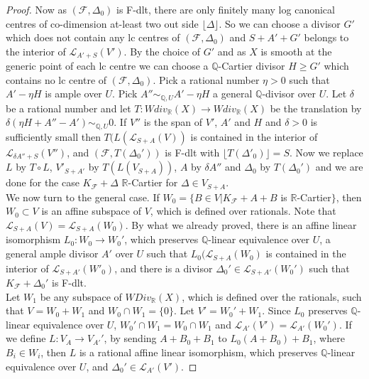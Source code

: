 \documentclass[12pt]{amsart}%
\theoremstyle{plain}
\theoremstyle{remark}
\theoremstyle{definition}
\newcommand{\<}{\leq}
\newcommand{\mbQ}{\mathbb{Q}}
\newcommand{\mbR}{\mathbb{R}}
\theoremstyle{definition}
\theoremstyle{definition}
\numberwithin{equation}{section}
\theoremstyle{remark}
\begin{document}
\begin{proof}
Now as $(\mathcal{F},\Delta_0)$ is F-dlt, there are only finitely many log canonical centres of co-dimension at-least two out side $\lfloor \Delta\rfloor$. So we can choose a divisor $G'$ which does not contain any lc centres of $(\mathcal{F},\Delta_0)$ and $S+A'+G'$ belongs to the interior of $\mathcal{L}_{A'+S}(V')$. By the choice of $G'$ and as $X$ is smooth at the generic point of each lc centre we can choose a $\mbQ$-Cartier divisor $H\geqslant G'$ which contains no lc centre of $(\mathcal{F},\Delta_0)$. Pick a rational number $\eta>0$ such that $A'-\eta H$ is ample over $U$. Pick $A''\sim_{\mbQ,U} A'-\eta H$ a general $\mbQ$-divisor over $U$. Let $\delta$ be a rational number and let $T:Wdiv_{\mbR}(X)\rightarrow Wdiv_{\mbR}(X)$ be the translation by $\delta(\eta H+A''-A')\sim_{\mbQ,U}0$. If $V''$ is the span of $V'$, $A'$ and $H$ and $\delta>0$ is sufficiently small then $T(L(\mathcal{L}_{S+A}(V))$ is contained in the interior of $\mathcal{L}_{\delta A''+S}(V'')$, and $(\mathcal{F},T(\Delta_0'))$ is F-dlt with $\lfloor T(\Delta'_0)\rfloor=S$. Now we replace $L$ by $T\circ L$, $V'_{S+A'}$ by $T(L(V_{S+A}))$, $A$ by $\delta A''$ and $\Delta_0$ by $T(\Delta_0')$ and we are done for the case $K_{\mathcal{F}}+\Delta$ $\mbR$-Cartier for $\Delta\in V_{S+A}$. \\

We now turn to the general case. If $W_0=\lbrace B\in V|K_{\mathcal{F}}+A+B$ is $\mbR$-Cartier$\rbrace$, then $W_0\subset V$ is an affine subspace of $V$, which is defined over rationals. Note that $\mathcal{L}_{S+A}(V)=\mathcal{L}_{S+A}(W_0)$. By what we already proved, there is an affine linear isomorphism $L_0:W_0\rightarrow W_0'$, which preserves $\mbQ$-linear equivalence over $U$, a general ample divisor $A'$ over $U$ such that $L_0(\mathcal{L}_{S+A}(W_0)$ is contained in the interior of $\mathcal{L}_{S+A'}(W'_0)$, and there is a divisor $\Delta_0'\in \mathcal{L}_{S+A'}(W_0')$ such that $K_{\mathcal{F}}+\Delta_0'$ is F-dlt. \\
Let $W_1$ be any subspace of $WDiv_{\mbR}(X)$, which is defined over the rationals, such that $V=W_0+W_1$ and $W_0\cap W_1=\lbrace 0\rbrace $. Let $V'=W_0'+W_1$. Since $L_0$ preserves $\mbQ$-linear equivalence over $U$, $W_0'\cap W_1=W_0\cap W_1$ and $\mathcal{L}_{A'}(V')=\mathcal{L}_{A'}(W_0')$. If we define $L:V_A\rightarrow V_{A'}'$, by sending $A+B_0+B_1$ to $L_0(A+B_0)+B_1$, where $B_i\in W_i$, then $L$ is a rational affine linear isomorphism, which preserves $\mbQ$-linear equivalence over $U$, and $\Delta_0'\in \mathcal{L}_{A'}(V')$.
 

    
\end{proof}
\end{document}
